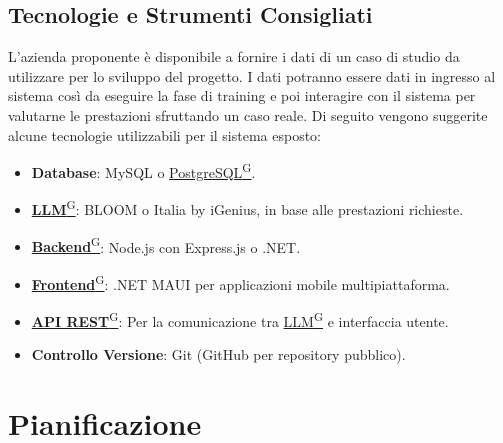 \documentclass{article}
\begin{document}
    \subsection{Tecnologie e Strumenti Consigliati}
    L’azienda proponente è disponibile a fornire i dati di un caso di studio da utilizzare
    per lo sviluppo del progetto. I dati potranno essere dati in ingresso al sistema così da eseguire la fase di
    training e poi interagire con il sistema per valutarne le prestazioni sfruttando un caso reale.
    Di seguito vengono suggerite alcune tecnologie utilizzabili per il sistema esposto:
    \begin{itemize}
        \item \textbf{Database}: MySQL o \href{https://code7crusaders.github.io/docs/RTB/documentazione_interna/glossario.html#postgresql}{PostgreSQL\textsuperscript{G}}.
        \item \href{https://code7crusaders.github.io/docs/RTB/documentazione_interna/glossario.html#llm-large-language-model}{\textbf{LLM}\textsuperscript{G}}: BLOOM o Italia by iGenius, in base alle prestazioni richieste.
        \item \href{https://code7crusaders.github.io/docs/RTB/documentazione_interna/glossario.html#backend}{\textbf{Backend}\textsuperscript{G}}: Node.js con Express.js o .NET.
        \item \href{https://code7crusaders.github.io/docs/RTB/documentazione_interna/glossario.html#frontend}{\textbf{Frontend}\textsuperscript{G}}: .NET MAUI per applicazioni mobile multipiattaforma.
        \item \href{https://code7crusaders.github.io/docs/RTB/documentazione_interna/glossario.html#api-rest-representational-state-transfer}{\textbf{API REST}\textsuperscript{G}}: Per la comunicazione tra \href{https://code7crusaders.github.io/docs/RTB/documentazione_interna/glossario.html#llm-large-language-model}{LLM\textsuperscript{G}} e interfaccia utente.
        \item \textbf{Controllo Versione}: Git (GitHub per repository pubblico).
    \end{itemize}




\newpage
\section{Pianificazione}
\end{document}
